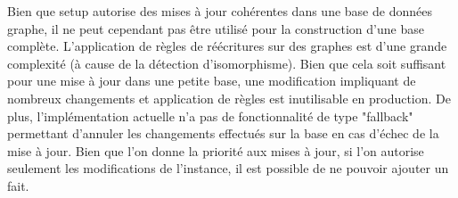 Bien que \gls{setup} autorise des mises à jour cohérentes dans une base de données graphe, il ne peut cependant pas être utilisé pour la construction d'une base complète.
L'application de règles de réécritures sur des graphes est d'une grande complexité (à cause de la détection d'isomorphisme).
Bien que cela soit suffisant pour une mise à jour dans une petite base, une modification impliquant de nombreux changements et application de règles est inutilisable en production.
De plus, l'implémentation actuelle n'a pas de fonctionnalité de type "fallback" permettant d'annuler les changements effectués sur la base en cas d'échec de la mise à jour.
Bien que l'on donne la priorité aux mises à jour, si l'on autorise seulement les modifications de l'instance, il est possible de ne pouvoir ajouter un fait.
